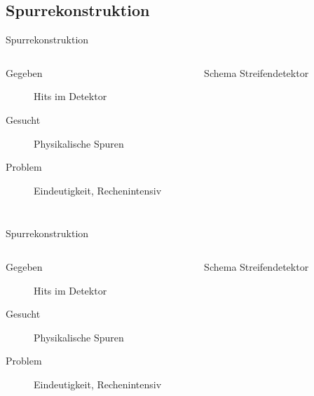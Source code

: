 \subsection[]{Spurrekonstruktion}

\begin{frame}{Spurrekonstruktion}
	\begin{columns}[T]
			\begin{description}
			  \item[Gegeben] Hits im Detektor
			  \item[Gesucht] Physikalische Spuren
			  \item[Problem] Eindeutigkeit, Rechenintensiv
			\end{description}
			
	    	\begin{figure}[htbp]
			  \centering
			   
			  \caption{Schema Streifendetektor}
			\end{figure}
    \end{columns}
\end{frame}

\begin{frame}{Spurrekonstruktion}
	\begin{columns}[T]
				\begin{description}
			  \item[Gegeben] Hits im Detektor
			  \item[Gesucht] Physikalische Spuren
			  \item[Problem] Eindeutigkeit, Rechenintensiv
			\end{description}
	    	\begin{figure}[htbp]
			  \centering
			   
			  \caption{Schema Streifendetektor}
			\end{figure}
    \end{columns}
\end{frame}